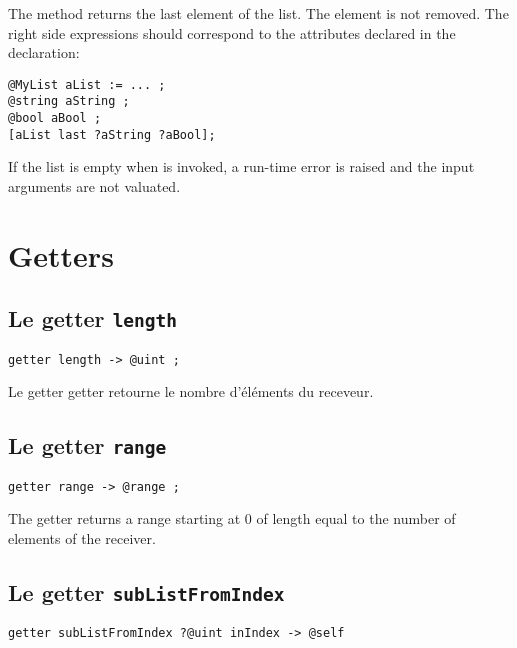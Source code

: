 The  method returns the last element of the list. The element is not removed. The right side expressions should correspond to the attributes declared in the  declaration:\\

\begin{lstlisting}[language=galgas]
@MyList aList := ... ;
@string aString ;
@bool aBool ;
[aList last ?aString ?aBool];
\end{lstlisting}


If the list is empty when  is invoked, a run-time error is raised and the input arguments are not valuated.








\section{Getters}

\subsection{Le getter \texttt{length}}

\begin{lstlisting}[language=galgas]
getter length -> @uint ;
\end{lstlisting}

Le getter  getter retourne le nombre d'éléments du receveur.


\subsection{Le getter \texttt{range}}

\begin{lstlisting}[language=galgas]
getter range -> @range ;
\end{lstlisting}

The  getter returns a range starting at $0$ of length equal to the number of elements of the receiver.




\subsection{Le getter \texttt{subListFromIndex}}

\begin{lstlisting}[language=galgas]
getter subListFromIndex ?@uint inIndex -> @self
\end{lstlisting}

